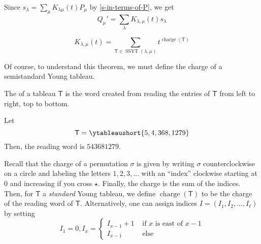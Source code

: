 \documentclass[11pt,leqno,oneside]{amsart}
\numberwithin{thm}{section}
\newcommand{\T}{\mathsf{T}} %
\newcommand{\charge}{\operatorname{charge}}
\newcommand{\SSYT}{\operatorname{SSYT}} %
\begin{document}
\begin{prop}
  Since \(s_\lambda = \sum_\mu K_{\lambda \mu}(t) P_\mu\) by
  \ref{s-in-terms-of-P}, we get \[
    Q_\mu' = \sum_{\lambda} K_{\lambda,\mu}(t) s_\lambda
  \]
\end{prop}
\begin{thm}
  \[
    K_{\lambda,\mu}(t) = \sum_{\T \in \SSYT(\lambda,\mu)} t^{\charge(\T)}
  \]
\end{thm}
Of course, to understand this theorem, we must define the charge of a
semistandard Young tableau.
\begin{defn}
  The  of a tableau \(\T\) is the word created from
  reading the entries of \(\T\) from left to right, top to bottom.
\end{defn}
\begin{example}
  Let \[
    \T = \ytableaushort{5,4,368,1279}
  \]
  Then, the reading word is \(543681279\).
\end{example}
\begin{defn}
  Recall that the charge of a permutation \(\sigma\) is given by
  writing \(\sigma\) counterclockwise on a circle and labeling the
  letters \(1,2,3,\ldots\) with an ``index'' clockwise starting at
  \(0\) and increasing 
  if you cross \(\star\). Finally, the charge is the sum of the
  indices. Then, for \(\T\) a \emph{standard} Young tableau,
  we define \(\charge(\T)\) to be the 
  charge of the reading word of \(\T\). Alternatively, one can assign
  indices \(I=(I_1,I_2, \ldots, I_\ell)\) by setting \[
    I_1 = 0, I_x =
    \begin{cases}
      I_{x-1} + 1 & \text{ if }x\text{ is east of }x-1\\
      I_{x-1} & \text{ else}
    \end{cases}
  \]
\end{defn}
\end{document}
